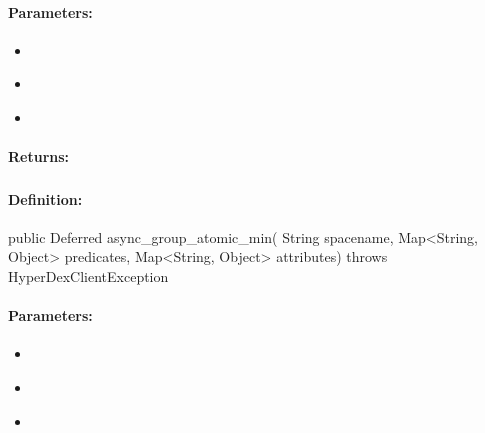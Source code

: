 \paragraph{Parameters:}
\begin{itemize}[noitemsep]
\item {}\\

\item {}\\

\item {}\\

\end{itemize}

\paragraph{Returns:}


\pagebreak
\subsubsection{}
\label{api:java:async_group_atomic_min}


\paragraph{Definition:}
\begin{javacode}
public Deferred async_group_atomic_min(
        String spacename,
        Map<String, Object> predicates,
        Map<String, Object> attributes) throws HyperDexClientException
\end{javacode}

\paragraph{Parameters:}
\begin{itemize}[noitemsep]
\item {}\\

\item {}\\

\item {}\\

\end{itemize}

